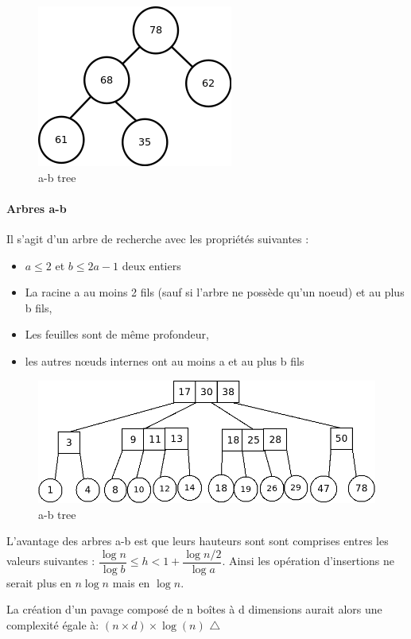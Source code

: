 \begin{figure}[htbp]
  \centering
  \includegraphics[scale=0.60]{img/binTree}
  \caption{a-b tree}
  \label{fig:dnuages}
\end{figure}

\clearpage
\paragraph{Arbres a-b}
Il s'agit d'un arbre de recherche avec les propriétés suivantes :
\begin{itemize}
\item
  $a\leq2$ et $b\leq 2a−1$ deux entiers
\item
  La racine a au moins 2 fils (sauf si l'arbre ne possède qu'un noeud) et au plus b fils,
\item 
  Les feuilles sont de même profondeur,
\item
  les autres nœuds internes ont au moins a et au plus b fils
\end{itemize}

\begin{figure}[htbp]
  \centering
  \includegraphics[scale=0.40]{img/abtree}
  \caption{a-b tree}
  \label{fig:dnuages}
\end{figure}


L'avantage des arbres a-b est que leurs hauteurs sont sont comprises entres les valeurs suivantes : $ \dfrac{\log{n}}{\log{b}}   \leq h  < 1 + \dfrac{\log{n/2}}{\log{a}}$. Ainsi les opération d'insertions ne serait plus en $n\log{n}$ mais en $\log{n}$.

La création d'un pavage composé de n boîtes à d dimensions aurait alors une complexité égale à: $(n\times d)\times\log(n)$ $\triangle$


